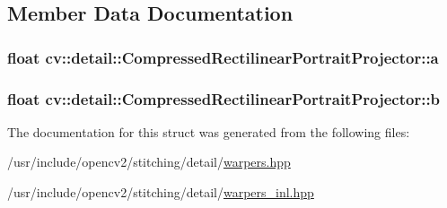 \subsection{Member Data Documentation}
\hypertarget{structcv_1_1detail_1_1CompressedRectilinearPortraitProjector_acb527ebab56f189dbef042b9c1fccc7e}{
\subsubsection[{a}]{\setlength{\rightskip}{0pt plus 5cm}float cv\-::detail\-::\-Compressed\-Rectilinear\-Portrait\-Projector\-::a}}\label{structcv_1_1detail_1_1CompressedRectilinearPortraitProjector_acb527ebab56f189dbef042b9c1fccc7e}
\hypertarget{structcv_1_1detail_1_1CompressedRectilinearPortraitProjector_a157e0e5ccd1ee08636eb1eadcdc95251}{
\subsubsection[{b}]{\setlength{\rightskip}{0pt plus 5cm}float cv\-::detail\-::\-Compressed\-Rectilinear\-Portrait\-Projector\-::b}}\label{structcv_1_1detail_1_1CompressedRectilinearPortraitProjector_a157e0e5ccd1ee08636eb1eadcdc95251}


The documentation for this struct was generated from the following files\-:\begin{DoxyCompactItemize}
\item 
/usr/include/opencv2/stitching/detail/\hyperlink{detail_2warpers_8hpp}{warpers.\-hpp}\item 
/usr/include/opencv2/stitching/detail/\hyperlink{warpers__inl_8hpp}{warpers\-\_\-inl.\-hpp}\end{DoxyCompactItemize}

